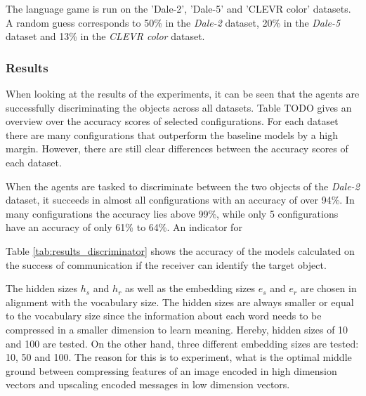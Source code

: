 The language game is run on the 'Dale-2', 'Dale-5' and 'CLEVR color' datasets.
A random guess corresponds to 50\% in the \emph{Dale-2} dataset, 20\% in the \emph{Dale-5} dataset and 13\% in the \emph{CLEVR color} dataset.

\subsubsection*{Results}
When looking at the results of the experiments, it can be seen that the agents are successfully discriminating the objects across all datasets.
Table TODO gives an overview over the accuracy scores of selected configurations.
For each dataset there are many configurations that outperform the baseline models by a high margin.
However, there are still clear differences between the accuracy scores of each dataset.

When the agents are tasked to discriminate between the two objects of the \emph{Dale-2} dataset, it succeeds in almost all configurations with an accuracy of over 94\%.
In many configurations the accuracy lies above 99\%, while only 5 configurations have an accuracy of only 61\% to 64\%.
An indicator for



Table \ref{tab:results_discriminator} shows the accuracy of the models calculated on the success of communication if the receiver can identify the target object.

The hidden sizes $h_s$ and $h_r$ as well as the embedding sizes $e_s$ and $e_r$ are chosen in alignment with the vocabulary size.
The hidden sizes are always smaller or equal to the vocabulary size since the information about each word needs to be compressed in a smaller dimension to learn meaning.
Hereby, hidden sizes of 10 and 100 are tested.
On the other hand, three different embedding sizes are tested: 10, 50 and 100.
The reason for this is to experiment, what is the optimal middle ground between compressing features of an image encoded in high dimension vectors and upscaling encoded messages in low dimension vectors.


